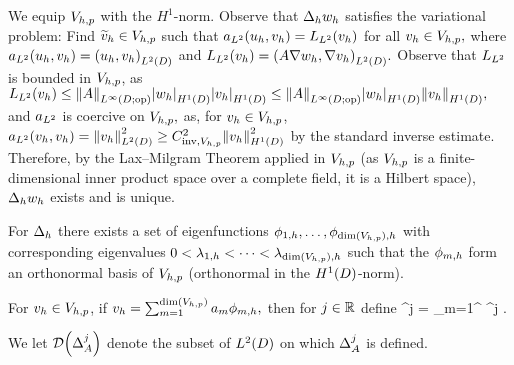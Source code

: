 We equip $V_{h,p}$ with the $H^1$-norm. Observe that $\Delta_{h} w_{h}$ satisfies the variational problem: Find $\widetilde{v}_{h}  \in V_{h,p}$ such that $a_{L^{2}}(u_{h},v_{h}) = L_{L^{2}}(v_{h})$ for all $v_{h} \in V_{h,p},$ where $\add(\uh,\vh) = \IPLtD{\uh}{\vh}$ and $\Ldd(\vh) = \IPLtD{A \grad \wh}{\grad \vh}.$ Observe that $L_{L^{2}}$ is bounded in $V_{h,p}$, as $\Ldd(\vh) \leq \NLiDop{A} \SNHoD{\wh}\SNHoD{\vh} \leq \NLiDop{A} \SNHoD{\wh}\NHoD{\vh},$ and $a_{L^{2}}$ is coercive on $V_{h,p},$ as, for $v_{h} \in V_{h,p}$, $\add(\vh,\vh) = \NLtD{\vh}^2 \geq \CinvVhp^2 \NHoD{\vh}^2$ by the standard inverse estimate. Therefore, by the Lax--Milgram Theorem applied in $V_{h,p}$ (as $V_{h,p}$ is a finite-dimensional inner product space over a complete field, it is a Hilbert space), $\Delta_{h} w_{h}$ exists and is unique.
\epf


For $\Delta_{h}$ there exists a set of eigenfunctions $\phioh,\ldots,\phidimVhph$  with corresponding eigenvalues $0 < \lambdaoh < \cdots < \lambdadimVhph$ such that the $\phi_{m,h}$ form an orthonormal basis of $V_{h,p}$ (orthonormal in the $\HoD$-norm).

For $v_{h} \in V_{h,p}$, if $\vh = \sum_{m=1}^{\dimVhp} \am \phimh,$ then for $j \in \mathbb R$ define
\beqs
\Deltah^j \vh = \sum_{m=1}^{\dimVhp} \lambdamh^j \am \phimh.
\eeqs

\ede

We let $\Domain{\DeltaA^j}$ denote the subset of $\LtD$ on which $\Delta_{A}^j$ is defined.


